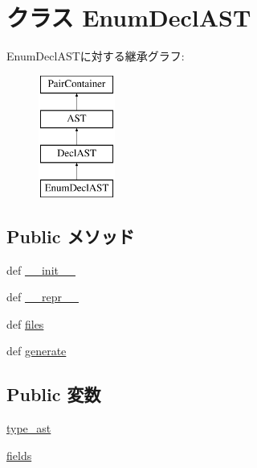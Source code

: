 \hypertarget{classslicc_1_1ast_1_1EnumDeclAST_1_1EnumDeclAST}{
\section{クラス EnumDeclAST}
\label{classslicc_1_1ast_1_1EnumDeclAST_1_1EnumDeclAST}
}
EnumDeclASTに対する継承グラフ:\begin{figure}[H]
\begin{center}
\leavevmode
\includegraphics[height=4cm]{classslicc_1_1ast_1_1EnumDeclAST_1_1EnumDeclAST}
\end{center}
\end{figure}
\subsection*{Public メソッド}
\begin{DoxyCompactItemize}
\item 
def \hyperlink{classslicc_1_1ast_1_1EnumDeclAST_1_1EnumDeclAST_ac775ee34451fdfa742b318538164070e}{\_\-\_\-init\_\-\_\-}
\item 
def \hyperlink{classslicc_1_1ast_1_1EnumDeclAST_1_1EnumDeclAST_ad8b9328939df072e4740cd9a63189744}{\_\-\_\-repr\_\-\_\-}
\item 
def \hyperlink{classslicc_1_1ast_1_1EnumDeclAST_1_1EnumDeclAST_a35b1a87f6fcbddeb5b793b0e415765f8}{files}
\item 
def \hyperlink{classslicc_1_1ast_1_1EnumDeclAST_1_1EnumDeclAST_a4555d1cee0dccf3942ea35fe86de2e8e}{generate}
\end{DoxyCompactItemize}
\subsection*{Public 変数}
\begin{DoxyCompactItemize}
\item 
\hyperlink{classslicc_1_1ast_1_1EnumDeclAST_1_1EnumDeclAST_a2c41e611550596541faa6f64ffecc139}{type\_\-ast}
\item 
\hyperlink{classslicc_1_1ast_1_1EnumDeclAST_1_1EnumDeclAST_a0ac22a12ba104aaad1f7652877543f3b}{fields}
\end{DoxyCompactItemize}


